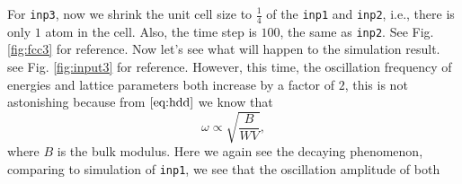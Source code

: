 For \texttt{inp3}, now we shrink the unit cell size to $\frac{ 1 }{ 4 }$ of the
\texttt{inp1} and \texttt{inp2}, i.e., there is only $1$  atom in the
cell. Also, the time step is $100$, the same as \texttt{inp2}.
See Fig. \ref{fig:fcc3} for reference.
Now let's see what will happen to the simulation result. see Fig. \ref{fig:input3}
for reference.
However, this time, the oscillation frequency of energies and lattice parameters
both increase by a factor of $2$, this is not astonishing because from
$\eqref{eq:hdd}$ we know that
\begin{equation}
  \omega \propto \sqrt{
 \frac{ B }{ W V }
 },
\end{equation}
where $B$ is the bulk modulus.
Here we again see the decaying phenomenon,
comparing to simulation of \texttt{inp1}, we see that the oscillation amplitude of
both
